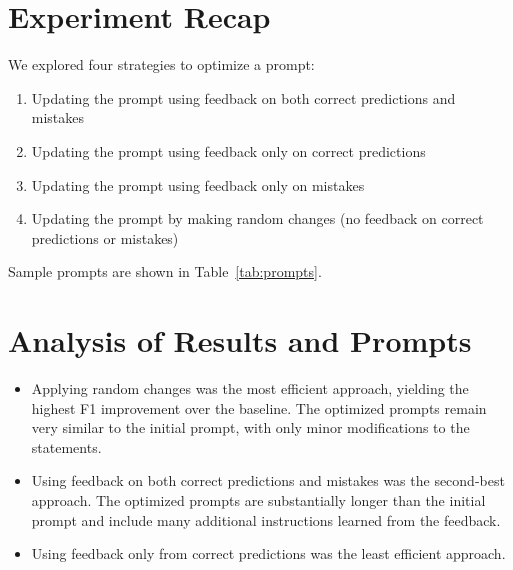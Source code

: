 \documentclass[12pt]{article}
\begin{document}
\section{Experiment Recap}
We explored four strategies to optimize a prompt:
\begin{enumerate}
    \item Updating the prompt using feedback on both correct predictions and mistakes
    \item Updating the prompt using feedback only on correct predictions
    \item Updating the prompt using feedback only on mistakes
    \item Updating the prompt by making random changes (no feedback on correct predictions or mistakes)
\end{enumerate}

Sample prompts are shown in Table~\ref{tab:prompts}.

\section{Analysis of Results and Prompts}
\begin{itemize}
    \item Applying random changes was the most efficient approach, yielding the highest F1 improvement over the baseline. The optimized prompts remain very similar to the initial prompt, with only minor modifications to the statements.
    \item Using feedback on both correct predictions and mistakes was the second-best approach. The optimized prompts are substantially longer than the initial prompt and include many additional instructions learned from the feedback.
    \item Using feedback only from correct predictions was the least efficient approach.
\end{itemize}
\end{document}
